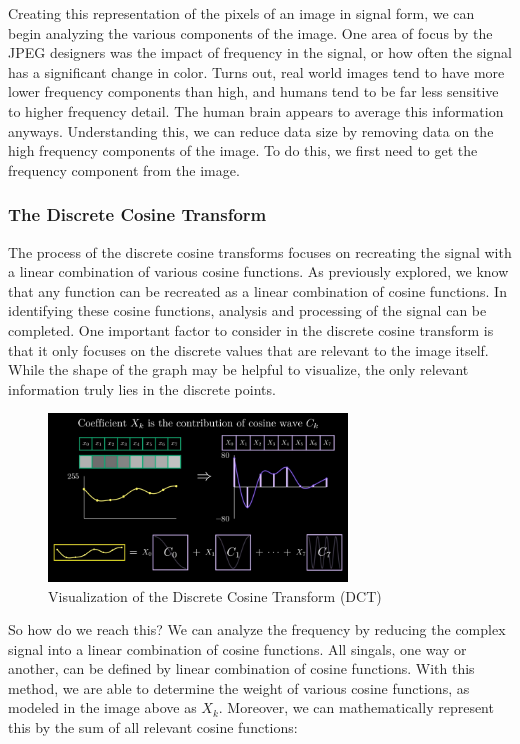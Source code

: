 \documentclass[11pt]{article}
\begin{document}
Creating this representation of the pixels of an image in signal form, we can begin analyzing the various components of the image. One area of focus by the JPEG designers was the impact of frequency in the signal, or how often the signal has a significant change in color. Turns out, real world images tend to have more lower frequency components than high, and humans tend to be far less sensitive to higher frequency detail. The human brain appears to average this information anyways. Understanding this, we can reduce data size by removing data on the high frequency components of the image. To do this, we first need to get the frequency component from the image.

\subsubsection{The Discrete Cosine Transform}

The process of the discrete cosine transforms focuses on recreating the signal with a linear combination of various cosine functions. As previously explored, we know that any function can be recreated as a linear combination of cosine functions. In identifying these cosine functions, analysis and processing of the signal can be completed. One important factor to consider in the discrete cosine transform is that it only focuses on the discrete values that are relevant to the image itself. While the shape of the graph may be helpful to visualize, the only relevant information truly lies in the discrete points.

\begin{figure}[H]
    \begin{center}
    \includegraphics[width = 300px]{figures/jpegDCT.png}
    \caption{Visualization of the Discrete Cosine Transform (DCT) \cite{website:jpeg}}
    \label{fig:jpegDCT}
    \end{center} 
\end{figure}

So how do we reach this? We can analyze the frequency by reducing the complex signal into a linear combination of cosine functions. All singals, one way or another, can be defined by linear combination of cosine functions. With this method, we are able to determine the weight of various cosine functions, as modeled in the image above as $X_k$. Moreover, we can mathematically represent this by the sum of all relevant cosine functions:\\
\end{document}
